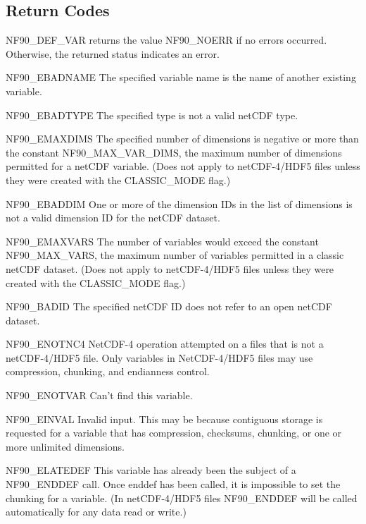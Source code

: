 \subsection*{Return Codes}

N\+F90\+\_\+\+D\+E\+F\+\_\+\+V\+AR returns the value N\+F90\+\_\+\+N\+O\+E\+RR if no errors occurred. Otherwise, the returned status indicates an error.


\begin{DoxyItemize}
\item N\+F90\+\_\+\+E\+B\+A\+D\+N\+A\+ME The specified variable name is the name of another existing variable.
\item N\+F90\+\_\+\+E\+B\+A\+D\+T\+Y\+PE The specified type is not a valid net\+C\+DF type.
\item N\+F90\+\_\+\+E\+M\+A\+X\+D\+I\+MS The specified number of dimensions is negative or more than the constant N\+F90\+\_\+\+M\+A\+X\+\_\+\+V\+A\+R\+\_\+\+D\+I\+MS, the maximum number of dimensions permitted for a net\+C\+DF variable. (Does not apply to net\+C\+D\+F-\/4/\+H\+D\+F5 files unless they were created with the C\+L\+A\+S\+S\+I\+C\+\_\+\+M\+O\+DE flag.)
\item N\+F90\+\_\+\+E\+B\+A\+D\+D\+IM One or more of the dimension I\+Ds in the list of dimensions is not a valid dimension ID for the net\+C\+DF dataset.
\item N\+F90\+\_\+\+E\+M\+A\+X\+V\+A\+RS The number of variables would exceed the constant N\+F90\+\_\+\+M\+A\+X\+\_\+\+V\+A\+RS, the maximum number of variables permitted in a classic net\+C\+DF dataset. (Does not apply to net\+C\+D\+F-\/4/\+H\+D\+F5 files unless they were created with the C\+L\+A\+S\+S\+I\+C\+\_\+\+M\+O\+DE flag.)
\item N\+F90\+\_\+\+B\+A\+D\+ID The specified net\+C\+DF ID does not refer to an open net\+C\+DF dataset.
\item N\+F90\+\_\+\+E\+N\+O\+T\+N\+C4 Net\+C\+D\+F-\/4 operation attempted on a files that is not a net\+C\+D\+F-\/4/\+H\+D\+F5 file. Only variables in Net\+C\+D\+F-\/4/\+H\+D\+F5 files may use compression, chunking, and endianness control.
\item N\+F90\+\_\+\+E\+N\+O\+T\+V\+AR Can’t find this variable.
\item N\+F90\+\_\+\+E\+I\+N\+V\+AL Invalid input. This may be because contiguous storage is requested for a variable that has compression, checksums, chunking, or one or more unlimited dimensions.
\item N\+F90\+\_\+\+E\+L\+A\+T\+E\+D\+EF This variable has already been the subject of a N\+F90\+\_\+\+E\+N\+D\+D\+EF call. Once enddef has been called, it is impossible to set the chunking for a variable. (In net\+C\+D\+F-\/4/\+H\+D\+F5 files N\+F90\+\_\+\+E\+N\+D\+D\+EF will be called automatically for any data read or write.)

\end{DoxyItemize}
